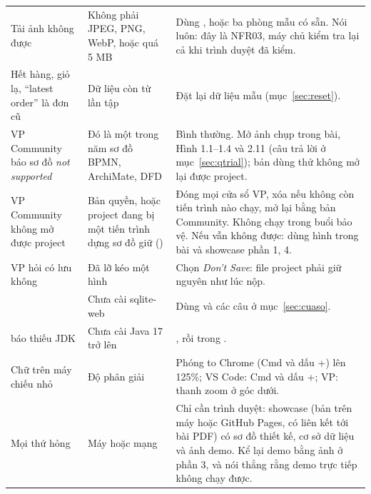 \begin{longtable}{@{}P{3.6cm}P{3.6cm}P{8.6cm}@{}}
\addlinespace
Tải ảnh không được & Không phải JPEG, PNG, WebP, hoặc quá 5 MB & Dùng ,  hoặc ba phòng mẫu có sẵn. Nói luôn: đây là NFR03, máy chủ kiểm tra lại cả khi trình duyệt đã kiểm.\\
\addlinespace
Hết hàng, giỏ lạ, ``latest order'' là đơn cũ & Dữ liệu còn từ lần tập & Đặt lại dữ liệu mẫu (mục~\ref{sec:reset}).\\
\addlinespace
VP Community báo sơ đồ \emph{not supported} & Đó là một trong năm sơ đồ BPMN, ArchiMate, DFD & Bình thường. Mở ảnh chụp trong bài, Hình 1.1--1.4 và 2.11 (câu trả lời ở mục~\ref{sec:qtrial}); bản dùng thử không mở lại được project.\\
\addlinespace
VP Community không mở được project & Bản quyền, hoặc project đang bị một tiến trình dựng sơ đồ giữ () & Đóng mọi cửa sổ VP, xóa  nếu không còn tiến trình nào chạy, mở lại bằng bản Community. Không chạy  trong buổi bảo vệ. Nếu vẫn không được: dùng hình trong bài và showcase phần 1, 4.\\
\addlinespace
VP hỏi có lưu không & Đã lỡ kéo một hình & Chọn \emph{Don't Save}: file project phải giữ nguyên như lúc nộp.\\
\addlinespace
{} & Chưa cài sqlite-web & Dùng  và các câu ở mục~\ref{sec:cuaso}.\\
\addlinespace
{} báo thiếu JDK & Chưa cài Java 17 trở lên & , rồi  trong .\\
\addlinespace
Chữ trên máy chiếu nhỏ & Độ phân giải & Phóng to Chrome (Cmd và dấu +) lên 125\%; VS Code: Cmd và dấu +; VP: thanh zoom ở góc dưới.\\
\addlinespace
Mọi thứ hỏng & Máy hoặc mạng & Chỉ cần trình duyệt: showcase (bản trên máy hoặc GitHub Pages, có liên kết tới bài PDF) có sơ đồ thiết kế, cơ sở dữ liệu và ảnh demo. Kể lại demo bằng ảnh ở phần 3, và nói thẳng rằng demo trực tiếp không chạy được.\\
\bottomrule
\end{longtable}

